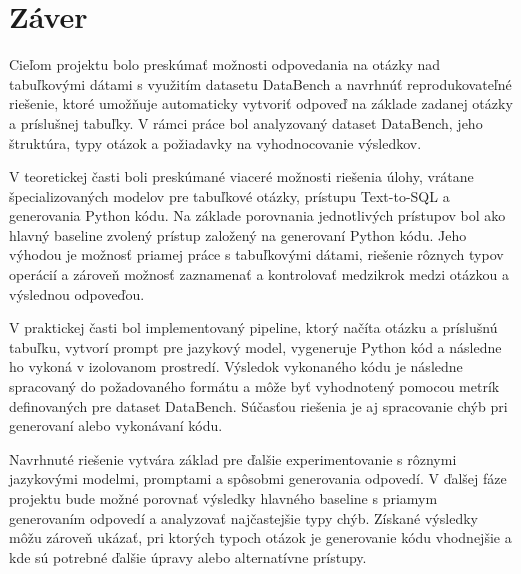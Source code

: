 \section*{Záver}

Cieľom projektu bolo preskúmať možnosti odpovedania na otázky nad tabuľkovými dátami s využitím datasetu DataBench a navrhnúť reprodukovateľné riešenie, ktoré umožňuje automaticky vytvoriť odpoveď na základe zadanej otázky a príslušnej tabuľky. V rámci práce bol analyzovaný dataset DataBench, jeho štruktúra, typy otázok a požiadavky na vyhodnocovanie výsledkov.

V teoretickej časti boli preskúmané viaceré možnosti riešenia úlohy, vrátane špecializovaných modelov pre tabuľkové otázky, prístupu Text-to-SQL a generovania Python kódu. Na základe porovnania jednotlivých prístupov bol ako hlavný baseline zvolený prístup založený na generovaní Python kódu. Jeho výhodou je možnosť priamej práce s tabuľkovými dátami, riešenie rôznych typov operácií a zároveň možnosť zaznamenať a kontrolovať medzikrok medzi otázkou a výslednou odpoveďou.

V praktickej časti bol implementovaný pipeline, ktorý načíta otázku a príslušnú tabuľku, vytvorí prompt pre jazykový model, vygeneruje Python kód a následne ho vykoná v izolovanom prostredí. Výsledok vykonaného kódu je následne spracovaný do požadovaného formátu a môže byť vyhodnotený pomocou metrík definovaných pre dataset DataBench. Súčasťou riešenia je aj spracovanie chýb pri generovaní alebo vykonávaní kódu.

Navrhnuté riešenie vytvára základ pre ďalšie experimentovanie s rôznymi jazykovými modelmi, promptami a spôsobmi generovania odpovedí. V ďalšej fáze projektu bude možné porovnať výsledky hlavného baseline s priamym generovaním odpovedí a analyzovať najčastejšie typy chýb. Získané výsledky môžu zároveň ukázať, pri ktorých typoch otázok je generovanie kódu vhodnejšie a kde sú potrebné ďalšie úpravy alebo alternatívne prístupy.